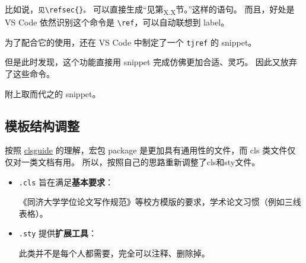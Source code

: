 \documentclass[../Main/thesis.tex]{subfiles}
\begin{document}
比如说，\texttt{见\textbackslash{}refsec\{\}。}
可以直接生成``见第\textsubscript{X.X}节。''这样的语句。 而且，好处是 VS
Code 依然识别这个命令是 \texttt{\textbackslash{}ref}，可以自动联想到
label。

为了配合它的使用，还在 VS Code 中制定了一个 \texttt{tjref} 的 snippet。

\begin{Shaded}
\begin{Highlighting}[]
    \FunctionTok{\{}
  \FunctionTok{:} \FunctionTok{,}
  \FunctionTok{:} \OtherTok{[}
    \CharTok{\textbackslash{}\textbackslash{}}
  \OtherTok{]}\FunctionTok{,}
  \FunctionTok{:} 
\FunctionTok{\}}\ErrorTok{,}
\end{Highlighting}
\end{Shaded}

但是此时发现，这个功能直接用 snippet 完成仿佛更加合适、灵巧。
因此又放弃了这些命令。

附上取而代之的 snippet。

\begin{Shaded}
\begin{Highlighting}[]
   \FunctionTok{\{}
    \FunctionTok{:} \FunctionTok{,}
    \FunctionTok{:} \OtherTok{[}
        \CharTok{\textbackslash{}\textbackslash{}}
    \OtherTok{]}\FunctionTok{,}
    \FunctionTok{:} 
\FunctionTok{\}}\ErrorTok{,}
\end{Highlighting}
\end{Shaded}

\subsection{模板结构调整}

按照
\href{http://texdoc.net/texmf-dist/doc/latex/base/clsguide.pdf}{clsguide}
的理解，宏包 package 是更加具有通用性的文件，而 cls
类文件仅仅对一类文档有用。 所以，按照自己的思路重新调整了cls和sty文件。

\begin{itemize}
\item
  \texttt{.cls} 旨在满足\textbf{基本要求}：

  《同济大学学位论文写作规范》等校方模版的要求，学术论文习惯（例如三线表格）。
\item
  \texttt{.sty} 提供\textbf{扩展工具}：

  此类并不是每个人都需要，完全可以注释、删除掉。
\end{itemize}
\end{document}
